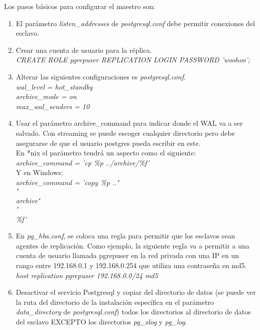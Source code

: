 Los pasos básicos para configurar el maestro son:

\begin{enumerate}
\item El parámetro \textit{listen\_addresses} de \textit{postgresql.conf} debe permitir conexiones del esclavo.

\item Crear una cuenta de usuario para la réplica.\\

\textit{CREATE ROLE pgrepuser REPLICATION LOGIN PASSWORD 'woohoo';}\\

\item Alterar las siguientes configuraciones es \textit{postgresql.conf}.\\

\textit{wal\_level = hot\_standby \\
archive\_mode = on \\
max\_wal\_senders = 10\\}

\item Usar el parámetro archive\_command para indicar donde el WAL va a ser salvado. Con streaming se puede escoger cualquier directorio pero debe asegurarse de que el usuario postgres pueda escribir en este.\\

En *nix el parámetro tendrá un aspecto como el siguiente:\\

\textit{archive\_command = 'cp \%p ../archive/\%f'}\\

Y en Windows:\\

\textit{archive\_command = 'copy \%p ..{\tt\char`\\}{\tt\char`\\}archive{\tt\char`\\}{\tt\char`\\}\%f'}\\

\item En \textit{pg\_hba.conf}, se coloca una regla para permitir que los esclavos sean agentes de replicación. Como ejemplo, la siguiente regla va a permitir a una cuenta de usuario llamada pgrepuser en la red privada con una IP en un rango entre 192.168.0.1 y 192.168.0.254 que utiliza una contraseña en md5.\\

\textit{host replication pgrepuser 192.168.0.0/24 md5}\\

\item Desactivar el servicio Postgresql y copiar del directorio de datos (se puede ver la ruta del directorio de la instalación específica en el parámetro \textit{data\_directory} de \textit{postgresql.conf}) todos los directorios al directorio de datos del esclavo EXCEPTO los directorios \textit{pg\_xlog} y \textit{pg\_log}.

\end{enumerate}

